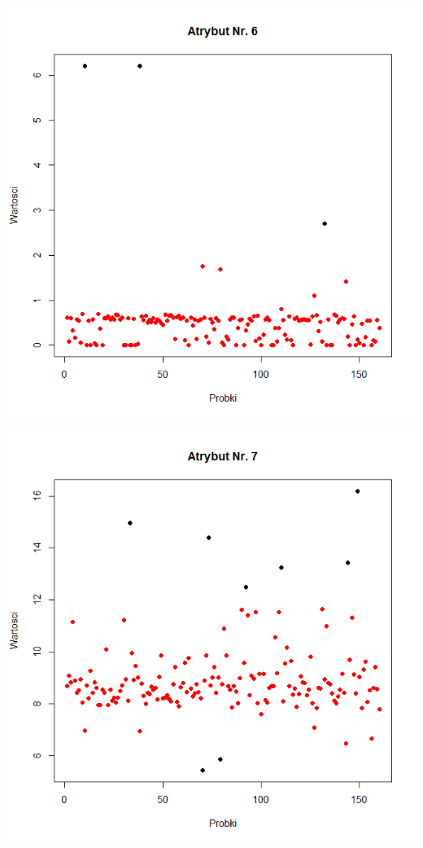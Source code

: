 \documentclass[a4paper,12pt,twoside]{article}
\begin{document}
\begin{center}
\includegraphics[width=.90\textwidth]{img/2_pkt_oddalone_6.png}
\end{center}

\begin{center}
\includegraphics[width=.90\textwidth]{img/2_pkt_oddalone_7.png}
\end{center}
\end{document}
